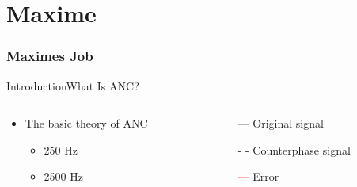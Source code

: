 \section{Maxime}
\begin{frame}
	\frametitle{Maximes Job}
	\tableofcontents[currentsection]
\end{frame}

\begin{frame}{Introduction}{What Is ANC?}		
	\begin{columns}
		\begin{column}{0.5\textwidth}
				\begin{itemize}
					\item The basic theory of ANC
					\begin{itemize}
						\item  250 Hz
						\item 2500 Hz 
					\end{itemize}	
				\end{itemize}
			\vspace{-2.5mm}	
		\begin{center}
	 		
	 	\end{center}
		\end{column}
		\begin{column}{0.5\textwidth} 
			\begin{itemize}
				\item[\textcolor{MATLABblue}{---}] Original signal
				\item[\textcolor{MATLABblue}{- -}] Counterphase signal
				\item[\textcolor{red}{---}] Error
			\end{itemize}
		\begin{center}
	 		
	 	\end{center}
		\end{column}
	\end{columns}
\end{frame}

